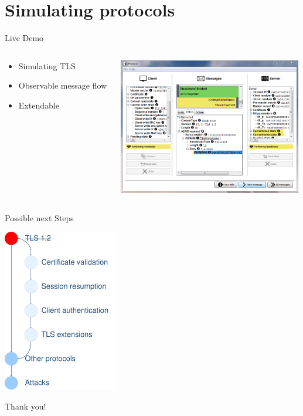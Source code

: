 \section{Simulating protocols}


%
%
%
%

\begin{frame}[c] {Live Demo}
\begin{columns}[c]
		\begin{column}{.4\textwidth}
			\begin{itemize}
				\item Simulating TLS
				\item Observable message flow
				\item Extendable 
			\end{itemize}
		\end{column}		
		\begin{column}{.6\textwidth}
			\includegraphics[width=8cm]{pic/ScreenshotTLS.png}
		\end{column}
	\end{columns}
\end{frame}

\begin{frame}[c]{Possible next Steps}
	\begin{center}
		\includegraphics[width=5cm]{pic/TODO.pdf}
	\end{center}
\end{frame}

\begin{frame}[c]{}
\begin{center}
\LARGE Thank you!
\end{center}
\end{frame}


